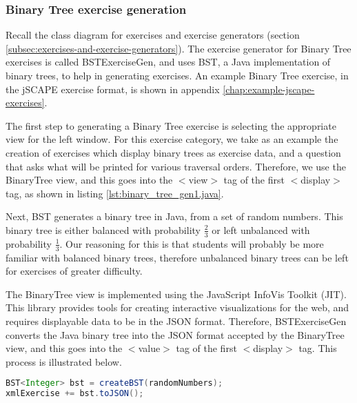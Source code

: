 \subsubsection{Binary Tree exercise generation}
Recall the class diagram for exercises and exercise generators (section \ref{subsec:exercises-and-exercise-generators}). The exercise generator for Binary Tree exercises is called \textsf{BSTExerciseGen}, and uses \textsf{BST}, a Java implementation of binary trees, to help in generating exercises. An example Binary Tree exercise, in the jSCAPE exercise format, is shown in appendix \ref{chap:example-jscape-exercises}.\newline

The first step to generating a Binary Tree exercise is selecting the appropriate view for the left window. For this exercise category, we take as an example the creation of exercises which display binary trees as exercise data, and a question that asks what will be printed for various traversal orders. Therefore, we use the \textsf{BinaryTree} view, and this goes into the \textsf{$<$view$>$} tag of the first \textsf{$<$display$>$} tag, as shown in listing \ref{lst:binary_tree_gen1.java}.\newline



Next, \textsf{BST} generates a binary tree in Java, from a set of random numbers. This binary tree is either balanced with probability $\frac{2}{3}$ or left unbalanced with probability $\frac{1}{3}$. Our reasoning for this is that students will probably be more familiar with balanced binary trees, therefore unbalanced binary trees can be left for exercises of greater difficulty.\newline

The \textsf{BinaryTree} view is implemented using the JavaScript InfoVis Toolkit (JIT)\cite{JIT}. This library provides tools for creating interactive visualizations for the web, and requires displayable data to be in the JSON format. Therefore, \textsf{BSTExerciseGen} converts the Java binary tree into the JSON format accepted by the \textsf{BinaryTree} view, and this goes into the \textsf{$<$value$>$} tag of the first \textsf{$<$display$>$} tag. This process is illustrated below. \newline

\begin{lstlisting}[language={Java}, label={lst:binary_tree_gen2.java}]
BST<Integer> bst = createBST(randomNumbers);
xmlExercise += bst.toJSON();
                            
\end{lstlisting}

